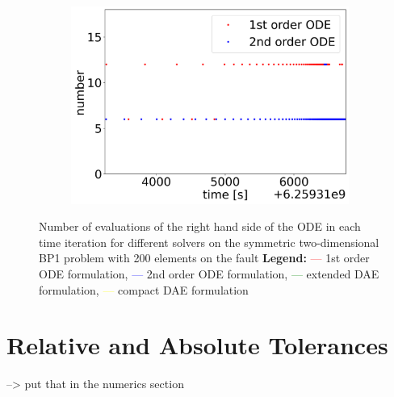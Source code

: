 \begin{figure}[H]
\begin{subfigure}{0.32\textwidth}
    	\includegraphics[width=1\textwidth]{images/TANDEMcompareFormulationstimeEvolutionRHSearthquake.png}
    \end{subfigure}
    \caption{Number of evaluations of the right hand side of the ODE in each time iteration for different solvers on the symmetric two-dimensional BP1 problem with 200 elements on the fault \newline
    \textbf{Legend:} \textcolor{red}{---} 1st order ODE formulation, \textcolor{blue}{---} 2nd order ODE formulation, \textcolor{green}{---} extended DAE formulation, \textcolor{yellow}{---} compact DAE formulation }
    \label{fig:timeEvolutionTANDEM_RHS}
\end{figure}

\section{Relative and Absolute Tolerances}
--> put that in the numerics section

